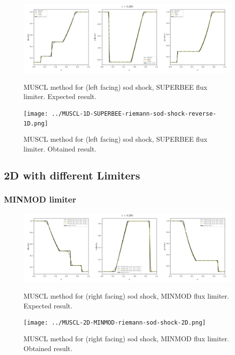     \begin{figure}[htbp]
        \centering
        \includegraphics[width=.9\textwidth]{./figures/MUSCL-1D-SUPERBEE-riemann-sod-shock-reverse-1D.png}%
        \caption{MUSCL method for (left facing) sod shock, SUPERBEE flux limiter. Expected result.}
        \texttt{[image: ../MUSCL-1D-SUPERBEE-riemann-sod-shock-reverse-1D.png]}%
        \caption{MUSCL method for (left facing) sod shock, SUPERBEE flux limiter. Obtained result.}
    \end{figure}









\subsection{2D with different Limiters}






\clearpage
\subsubsection{MINMOD limiter}

    \begin{figure}[htbp]
        \centering
        \includegraphics[width=.9\textwidth]{./figures/MUSCL-2D-MINMOD-riemann-sod-shock-2D.png}%
        \caption{MUSCL method for (right facing) sod shock, MINMOD flux limiter. Expected result.}
        \texttt{[image: ../MUSCL-2D-MINMOD-riemann-sod-shock-2D.png]}%
        \caption{MUSCL method for (right facing) sod shock, MINMOD flux limiter. Obtained result.}
    \end{figure}


